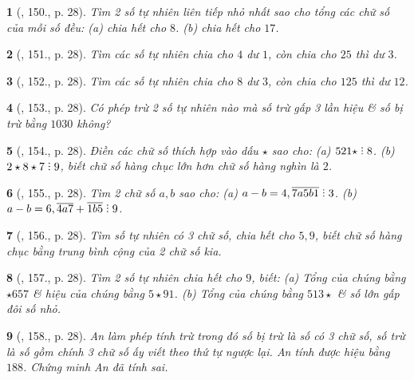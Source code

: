 \documentclass{article}
\newtheorem{baitoan}{}
\DeclareRobustCommand{\divby}{%
	\mathrel{\vbox{\baselineskip.65ex\lineskiplimit0pt\hbox{.}\hbox{.}\hbox{.}}}%
}
\begin{document}
\begin{baitoan}[\cite{Binh_Toan_6_tap_1}, 150., p. 28]
	Tìm 2 số tự nhiên liên tiếp nhỏ nhất sao cho tổng các chữ số của mỗi số đều: (a) chia hết cho $8$. (b) chia hết cho $17$.
\end{baitoan}

\begin{baitoan}[\cite{Binh_Toan_6_tap_1}, 151., p. 28]
	Tìm các số tự nhiên chia cho $4$ dư $1$, còn chia cho $25$ thì dư $3$.
\end{baitoan}

\begin{baitoan}[\cite{Binh_Toan_6_tap_1}, 152., p. 28]
	Tìm các số tự nhiên chia cho $8$ dư $3$, còn chia cho $125$ thì dư $12$.
\end{baitoan}

\begin{baitoan}[\cite{Binh_Toan_6_tap_1}, 153., p. 28]
	Có phép trừ 2 số tự nhiên nào mà số trừ gấp 3 lần hiệu \& số bị trừ bằng $1030$ không?
\end{baitoan}

\begin{baitoan}[\cite{Binh_Toan_6_tap_1}, 154., p. 28]
	Điền các chữ số thích hợp vào dấu $\star$ sao cho: (a) $521\star\divby8$. (b) $2\star8\star7\divby9$, biết chữ số hàng chục lớn hơn chữ số hàng nghìn là $2$.
\end{baitoan}

\begin{baitoan}[\cite{Binh_Toan_6_tap_1}, 155., p. 28]
	Tìm 2 chữ số $a,b$ sao cho: (a) $a - b = 4,\overline{7a5b1}\divby3$. (b) $a - b = 6,\overline{4a7} + \overline{1b5}\divby9$.
\end{baitoan}

\begin{baitoan}[\cite{Binh_Toan_6_tap_1}, 156., p. 28]
	Tìm số tự nhiên có 3 chữ số, chia hết cho $5,9$, biết chữ số hàng chục bằng trung bình cộng của 2 chữ số kia.
\end{baitoan}

\begin{baitoan}[\cite{Binh_Toan_6_tap_1}, 157., p. 28]
	Tìm 2 số tự nhiên chia hết cho $9$, biết: (a) Tổng của chúng bằng $\star657$ \& hiệu của chúng bằng $5\star91$. (b) Tổng của chúng bằng $513\star$ \& số lớn gấp đôi số nhỏ.
\end{baitoan}

\begin{baitoan}[\cite{Binh_Toan_6_tap_1}, 158., p. 28]
	An làm phép tính trừ trong đó số bị trừ là số có 3 chữ số, số trừ là số gồm chính 3 chữ số ấy viết theo thứ tự ngược lại. An tính được hiệu bằng $188$. Chứng minh An đã tính sai.
\end{baitoan}
\end{document}
